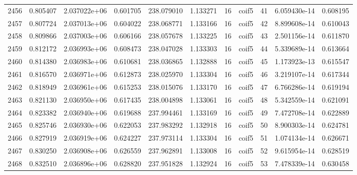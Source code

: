 \begin{tabular}{lrrrrrrlrrr}
2456 &    0.805407 &        2.037022e+06 &  0.601705 &              238.079010 &    1.133271 &      16 &        coif5 &     41 &   6.059430e-14 &      0.608195 \\
2457 &    0.807724 &        2.037013e+06 &  0.604022 &              238.068771 &    1.133166 &      16 &        coif5 &     42 &   8.899608e-14 &      0.610043 \\
2458 &    0.809866 &        2.037003e+06 &  0.606166 &              238.057678 &    1.133225 &      16 &        coif5 &     43 &   2.501156e-14 &      0.611870 \\
2459 &    0.812172 &        2.036993e+06 &  0.608473 &              238.047028 &    1.133303 &      16 &        coif5 &     44 &   5.339689e-14 &      0.613664 \\
2460 &    0.814380 &        2.036983e+06 &  0.610681 &              238.036865 &    1.132888 &      16 &        coif5 &     45 &   1.173923e-13 &      0.615547 \\
2461 &    0.816570 &        2.036971e+06 &  0.612873 &              238.025970 &    1.133304 &      16 &        coif5 &     46 &   3.219107e-14 &      0.617344 \\
2462 &    0.818949 &        2.036961e+06 &  0.615253 &              238.015076 &    1.133170 &      16 &        coif5 &     47 &   6.766286e-14 &      0.619194 \\
2463 &    0.821130 &        2.036950e+06 &  0.617435 &              238.004898 &    1.133061 &      16 &        coif5 &     48 &   5.342559e-14 &      0.621091 \\
2464 &    0.823382 &        2.036940e+06 &  0.619688 &              237.994461 &    1.133169 &      16 &        coif5 &     49 &   7.472708e-14 &      0.622889 \\
2465 &    0.825746 &        2.036930e+06 &  0.622053 &              237.983292 &    1.132918 &      16 &        coif5 &     50 &   8.900303e-14 &      0.624781 \\
2466 &    0.827919 &        2.036919e+06 &  0.624227 &              237.973114 &    1.133304 &      16 &        coif5 &     51 &   1.074134e-14 &      0.626671 \\
2467 &    0.830250 &        2.036908e+06 &  0.626559 &              237.962891 &    1.133008 &      16 &        coif5 &     52 &   9.615954e-14 &      0.628519 \\
2468 &    0.832510 &        2.036896e+06 &  0.628820 &              237.951828 &    1.132924 &      16 &        coif5 &     53 &   7.478339e-14 &      0.630458 \\

\end{tabular}
